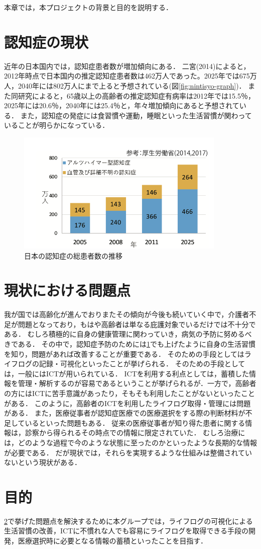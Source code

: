 \documentclass[../report]{subfiles}
\begin{document}
本章では，本プロジェクトの背景と目的を説明する．

\section{認知症の現状} \label{sec:genzyou}
近年の日本国内では，認知症患者数が増加傾向にある．
二宮(2014)によると，2012年時点で日本国内の推定認知症患者数は462万人であった。2025年では675万人，2040年には802万人にまで上ると予想されている(図\ref{fig:nintisyo-graph})．
また同研究によると，65歳以上の高齢者の推定認知症有病率は2012年では15.5％，2025年には20.6％，2040年には25.4％と，年々増加傾向にあると予想されている．
また，認知症の発症には食習慣や運動，睡眠といった生活習慣が関わっていることが明らかになっている\cite{seikatsu}．
\begin{figure}[htbp]
    \begin{center}
        \includegraphics[width=10cm]{imgs/ninchisyo-graph.png}
        \caption{日本の認知症の総患者数の推移}
        \label{fig:ninchisyo-graph}
    \end{center}
\end{figure}

\section{現状における問題点} \label{sec:mondai}
我が国では高齢化が進んでおりまたその傾向が今後も続いていく中で，介護者不足が問題となっており，もはや高齢者は単なる庇護対象でいるだけでは不十分である．
むしろ積極的に自身の健康管理に関わっていき，病気の予防に努めるべきである．
その中で，認知症予防のためには\ref{sec:genzyou}でも上げたように自身の生活習慣を知り，問題があれば改善することが重要である．
そのための手段としてはライフログの記録・可視化といったことが挙げられる\cite{lifelog}．
そのための手段としては，一般にはICTが用いられている．
ICTを利用する利点としては，蓄積した情報を管理・解析するのが容易であるということが挙げられるが．一方で，高齢者の方にはICTに苦手意識があったり，そもそも利用したことがないといったことがある．
このように，高齢者のICTを利用したライフログ取得・管理には問題がある．
また，医療従事者が認知症医療での医療選択をする際の判断材料が不足しているといった問題もある．
従来の医療従事者が知り得た患者に関する情報は，診察から得られるその時点での情報に限定されていた．
むしろ治療には，どのような過程で今のような状態に至ったのかといったような長期的な情報が必要である．
だが現状では，それらを実現するような仕組みは整備されていないという現状がある．

\section{目的}
\ref{sec:mondai}で挙げた問題点を解決するために本グループでは，ライフログの可視化による生活習慣の改善，ICTに不慣れな人でも容易にライフログを取得できる手段の開発，医療選択時に必要となる情報の蓄積といったことを目指す．
\end{document}
